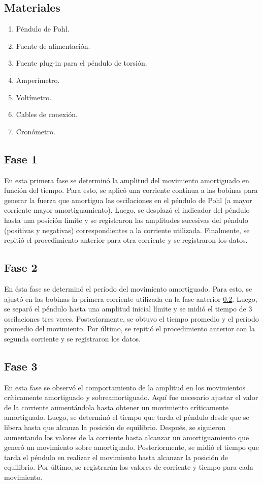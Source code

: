 \documentclass[spanish,notitlepage,letterpaper, 12pt]{article}
\begin{document}
\subsection{Materiales}
\begin{enumerate}
    \item Péndulo de Pohl.
    \item Fuente de alimentación.
    \item Fuente plug-in para el péndulo de torsión.
    \item Amperímetro.
    \item Voltímetro.
    \item Cables de conexión.
    \item Cronómetro.
\end{enumerate}
\subsection{Fase 1} \label{M.F1}
En esta primera fase se determinó la amplitud del movimiento amortiguado
en función del tiempo. Para esto, se aplicó una corriente continua a las bobinas para
generar la fuerza que amortigua las oscilaciones en el péndulo de Pohl (a mayor corriente
mayor amortiguamiento). Luego, se desplazó el indicador del péndulo hasta una posición límite y se registraron las
amplitudes sucesivas del péndulo (positivas y negativas) correspondientes a
la corriente utilizada. Finalmente, se repitió el procedimiento anterior para otra corriente
y se registraron los datos.
\subsection{Fase 2} \label{M.F2}
En ésta fase se determinó el período del movimiento amortiguado. Para esto,
se ajustó en las bobinas la primera corriente utilizada en la fase anterior \ref{M.F1}. Luego, se
separó el péndulo hasta una amplitud inicial límite y se midió el tiempo de 3
oscilaciones tres veces. Posteriormente, se obtuvo el tiempo promedio y el período promedio
del movimiento. Por último, se repitió el procedimiento anterior con la segunda
corriente y se registraron los datos.
\subsection{Fase 3} \label{M.F3}
En esta fase se observó el comportamiento de la amplitud en los
movimientos críticamente amortiguado y sobreamortiguado. Aquí fue necesario ajustar el
valor de la corriente aumentándola hasta obtener un movimiento críticamente amortiguado. Luego, se determinó el tiempo que tarda el péndulo desde que se libera hasta que alcanza la posición de
equilibrio. Después, se siguieron aumentando los valores
de la corriente hasta alcanzar un amortiguamiento que generó un movimiento sobre
amortiguado. Posteriormente, se midió el tiempo que tarda el péndulo en realizar el movimiento
hasta alcanzar la posición de equilibrio. Por último, se registrarán los valores de corriente
y tiempo para cada movimiento.
\end{document}
